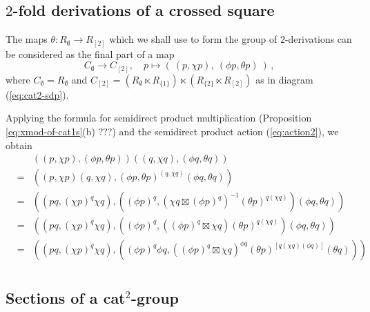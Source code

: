 \vspace*{15mm}
\subsection{$2$-fold derivations of a crossed square} \label{subs:xsq-der}

The maps $\theta : R_{\emptyset} \to R_{[2]}$ which we shall use to form
the group of $2$-derivations can be considered as the final part of a map
$$
C_{\emptyset} \to C_{[2]},\quad
p \mapsto (~(p, \chi p),~(\phi p, \theta p)~)\,,
$$
where $C_{\emptyset} = R_{\emptyset}$ and $C_{[2]} = 
(R_{\emptyset} \ltimes R_{\{1\}}) \ltimes (R_{\{2\}} \ltimes R_{[2]})$
as in diagram (\ref{eq:cat2-sdp}).

Applying the formula for semidirect product multiplication 
(Proposition \ref{eq:xmod-of-cat1s}(b) ???) 
and the semidirect product action (\ref{eq:action2}), we obtain
\begin{eqnarray*}
  &   & ((p, \chi p),(\phi p, \theta p))((q, \chi q),(\phi q, \theta q)) \\
  & = & ((p, \chi p)(q, \chi q),
         (\phi p, \theta p)^{(q, \chi q)}(\phi q,\theta q)) \\
  & = & ((pq, (\chi p)^q \chi q),
         ((\phi p)^q, (\chi q \boxtimes (\phi p)^q)^{-1} 
                      (\theta p)^{q (\chi q)}) (\phi q, \theta q)) \\
  & = & ((pq, (\chi p)^q \chi q),
         ((\phi p)^q, ((\phi p)^q \boxtimes \chi q) 
                      (\theta p)^{q (\chi q)}) (\phi q, \theta q)) \\
  & = & ((pq, (\chi p)^q \chi q),
         ((\phi p)^q \phi q, ((\phi p)^q \boxtimes \chi q)^{\phi q} 
                      (\theta p)^{[q (\chi q)(\phi q)]} (\theta q))) \\
\end{eqnarray*}



\subsection{Sections of a cat$^2$-group}

